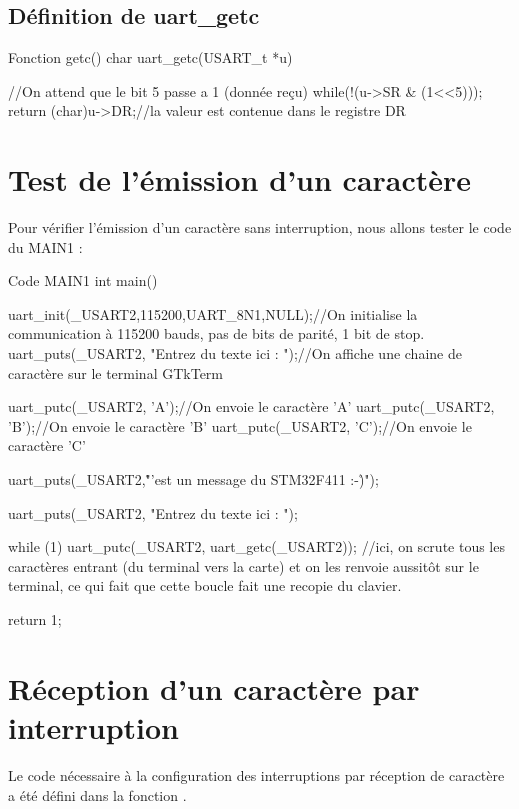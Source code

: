 {\subsection{Définition de uart\_getc}
\begin{Cpp}{Fonction getc()}
char uart_getc(USART_t *u) {

    //On attend que le bit 5 passe a 1 (donnée reçu)
	while(!(u->SR & (1<<5))){};
	return (char)u->DR;//la valeur est contenue dans le registre DR

}
\end{Cpp}


\section{Test de l'émission d'un caractère}

Pour vérifier l'émission d'un caractère sans interruption, nous allons tester le code du MAIN1 : 

\begin{Cpp}{Code MAIN1}
int main()
{
	uart_init(_USART2,115200,UART_8N1,NULL);//On initialise la communication à 115200 bauds, pas de bits de parité, 1 bit de stop.
	uart_puts(_USART2, "Entrez du texte ici : ");//On affiche une chaine de caractère sur le terminal GTkTerm

	uart_putc(_USART2, 'A');//On envoie le caractère 'A'
	uart_putc(_USART2, 'B');//On envoie le caractère 'B'
	uart_putc(_USART2, 'C');//On envoie le caractère 'C'
	
	uart_puts(_USART2,"\r\nC'est un message du STM32F411 :-)\r\n");

	uart_puts(_USART2, "Entrez du texte ici : ");

	while (1) {
		uart_putc(_USART2, uart_getc(_USART2));
	}
	//ici, on scrute tous les caractères entrant (du terminal vers la carte) et on les renvoie aussitôt sur le terminal, ce qui fait que cette boucle fait une recopie du clavier.

	return 1;
}
\end{Cpp}


\section{Réception d'un caractère par interruption}

Le code nécessaire à la configuration des interruptions par réception de caractère a été défini dans la fonction .

}
